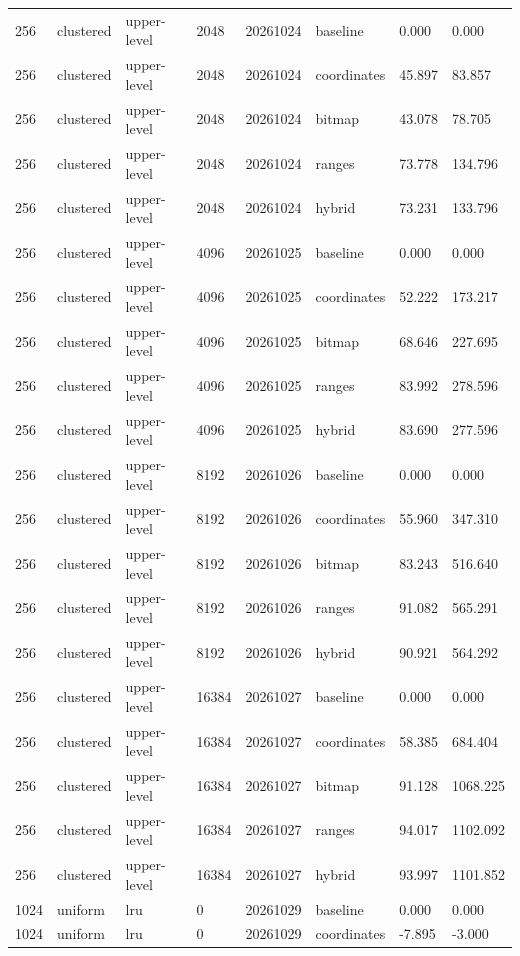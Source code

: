 \begin{tabular}{llllllll}
256 & clustered & upper-level & 2048 & 20261024 & baseline & 0.000 & 0.000 \\
256 & clustered & upper-level & 2048 & 20261024 & coordinates & 45.897 & 83.857 \\
256 & clustered & upper-level & 2048 & 20261024 & bitmap & 43.078 & 78.705 \\
256 & clustered & upper-level & 2048 & 20261024 & ranges & 73.778 & 134.796 \\
256 & clustered & upper-level & 2048 & 20261024 & hybrid & 73.231 & 133.796 \\
256 & clustered & upper-level & 4096 & 20261025 & baseline & 0.000 & 0.000 \\
256 & clustered & upper-level & 4096 & 20261025 & coordinates & 52.222 & 173.217 \\
256 & clustered & upper-level & 4096 & 20261025 & bitmap & 68.646 & 227.695 \\
256 & clustered & upper-level & 4096 & 20261025 & ranges & 83.992 & 278.596 \\
256 & clustered & upper-level & 4096 & 20261025 & hybrid & 83.690 & 277.596 \\
256 & clustered & upper-level & 8192 & 20261026 & baseline & 0.000 & 0.000 \\
256 & clustered & upper-level & 8192 & 20261026 & coordinates & 55.960 & 347.310 \\
256 & clustered & upper-level & 8192 & 20261026 & bitmap & 83.243 & 516.640 \\
256 & clustered & upper-level & 8192 & 20261026 & ranges & 91.082 & 565.291 \\
256 & clustered & upper-level & 8192 & 20261026 & hybrid & 90.921 & 564.292 \\
256 & clustered & upper-level & 16384 & 20261027 & baseline & 0.000 & 0.000 \\
256 & clustered & upper-level & 16384 & 20261027 & coordinates & 58.385 & 684.404 \\
256 & clustered & upper-level & 16384 & 20261027 & bitmap & 91.128 & 1068.225 \\
256 & clustered & upper-level & 16384 & 20261027 & ranges & 94.017 & 1102.092 \\
256 & clustered & upper-level & 16384 & 20261027 & hybrid & 93.997 & 1101.852 \\
1024 & uniform & lru & 0 & 20261029 & baseline & 0.000 & 0.000 \\
1024 & uniform & lru & 0 & 20261029 & coordinates & -7.895 & -3.000 \\

\end{tabular}
